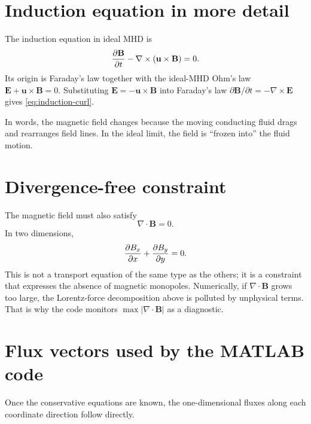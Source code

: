 \documentclass[11pt]{article}
\newcommand{\uvec}{\mathbf{u}}
\newcommand{\Bvec}{\mathbf{B}}
\begin{document}
\section{Induction equation in more detail}
The induction equation in ideal MHD is
\begin{equation}
\pdv{\Bvec}{t} - \nabla\times(\uvec\times\Bvec)=0.
\label{eq:induction-curl}
\end{equation}
Its origin is Faraday's law together with the ideal-MHD Ohm's law $\mathbf{E}+\uvec\times\Bvec=0$. Substituting $\mathbf{E}=-\uvec\times\Bvec$ into Faraday's law $\partial \Bvec/\partial t = -\nabla\times \mathbf{E}$ gives \eqref{eq:induction-curl}.

In words, the magnetic field changes because the moving conducting fluid drags and rearranges field lines. In the ideal limit, the field is ``frozen into'' the fluid motion.

\section{Divergence-free constraint}
The magnetic field must also satisfy
\begin{equation}
\nabla\cdot\Bvec = 0.
\label{eq:divB-zero}
\end{equation}
In two dimensions,
\begin{equation}
\pdv{B_x}{x} + \pdv{B_y}{y}=0.
\label{eq:divB-2d}
\end{equation}
This is not a transport equation of the same type as the others; it is a constraint that expresses the absence of magnetic monopoles. Numerically, if $\nabla\cdot\Bvec$ grows too large, the Lorentz-force decomposition above is polluted by unphysical terms. That is why the code monitors $\max |\nabla\cdot\Bvec|$ as a diagnostic.

\section{Flux vectors used by the MATLAB code}
Once the conservative equations are known, the one-dimensional fluxes along each coordinate direction follow directly.
\end{document}
